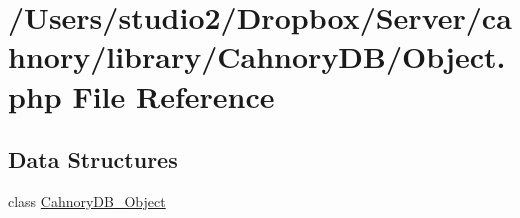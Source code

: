 \hypertarget{_object_8php}{
\section{/Users/studio2/Dropbox/Server/cahnory/library/CahnoryDB/Object.php File Reference}
\label{_object_8php}
}
\subsection*{Data Structures}
\begin{CompactItemize}
\item 
class \hyperlink{class_cahnory_d_b___object}{CahnoryDB\_\-Object}
\end{CompactItemize}
